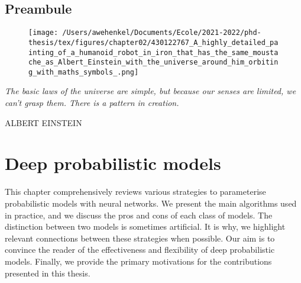 \thispagestyle{empty}
\section*{Preambule}

\begin{figure}[h]
  \centering

  \texttt{[image: /Users/awehenkel/Documents/Ecole/2021-2022/phd-thesis/tex/figures/chapter02/430122767\_A\_highly\_detailed\_painting\_of\_a\_humanoid\_robot\_in\_iron\_that\_has\_the\_same\_moustache\_as\_Albert\_Einstein\_with\_the\_universe\_around\_him\_orbiting\_with\_maths\_symbols\_.png]}
  \label{}
\end{figure}

\vfill

{
\textit{\justify
   The basic laws of the universe are simple, but because our senses are limited, we can't grasp them. There is a pattern in creation.}

  \par\bigskip
  \raggedleft\MakeUppercase{Albert Einstein}\\
  \par%
}

\chapter{Deep probabilistic models}\label{ch:02C}

\begin{chapter_outline}

This chapter comprehensively reviews various strategies to parameterise probabilistic models with neural networks. We present the main algorithms used in practice, and we discuss the pros and cons of each class of models.
The distinction between two models is sometimes artificial. It is why, we highlight relevant connections between these strategies when possible.
Our aim is to convince the reader of the effectiveness and flexibility of deep probabilistic models. Finally, we provide the primary motivations for the contributions presented in this thesis.
\end{chapter_outline}

